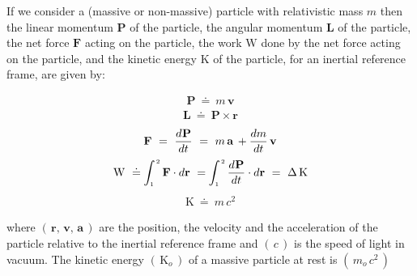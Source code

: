 \documentclass[10pt,fleqn]{article}
\begin{document}
\noindent If we consider a (massive or non-massive) particle with relativistic mass $m$ then the linear momentum $\mathbf{P}$ of the particle, the angular momentum $\mathbf{L}$ of the particle, the net force $\mathbf{F}$ acting on the particle, the work $\mathrm{W}$ done by the net force acting on the particle, and the kinetic energy $\mathrm{K}$ of the particle, for an inertial reference frame, are given by:
\par \vspace{-0.30em}
\begin{eqnarray*}
\mathbf{P} ~\doteq~ m \, \mathbf{v}
\end{eqnarray*}
\vspace{-0.60em}
\begin{eqnarray*}
\mathbf{L} ~\doteq~ \mathbf{P} \times \mathbf{r}
\end{eqnarray*}
\vspace{-0.30em}
\begin{eqnarray*}
\mathbf{F} ~=~ \dfrac{d\hspace{+0.045em}\mathbf{P}}{dt} ~=~ m \, \mathbf{a} \, + \dfrac{dm}{dt} \, \mathbf{v}
\end{eqnarray*}
\vspace{-0.30em}
\begin{eqnarray*}
\mathrm{W} ~\doteq~ \hspace{-0.36em} \int_{\scriptscriptstyle 1}^{\hspace{+0.09em}{\scriptscriptstyle 2}} \mathbf{F} \cdot d\mathbf{r} ~=~ \hspace{-0.36em} \int_{\scriptscriptstyle 1}^{\hspace{+0.09em}{\scriptscriptstyle 2}} \dfrac{d\hspace{+0.045em}\mathbf{P}}{dt} \cdot d\mathbf{r} ~=~ \Delta \, \mathrm{K}
\end{eqnarray*}
\vspace{-0.30em}
\begin{eqnarray*}
\mathrm{K} ~\doteq~ m \, c^2
\end{eqnarray*}
\par \vspace{+0.90em}
\noindent where $( \, \mathbf{r}, \, \mathbf{v}, \, \mathbf{a} \, )$ are the position, the velocity and the acceleration of the particle relative to the inertial reference frame and $( \, c \, )$ is the speed of light in vacuum. The kinetic energy $( \, \mathrm{K}_o \, )$ of a massive particle at rest is $( \, m_o \, c^2 \, )$

\vspace{+0.60em}
\end{document}
